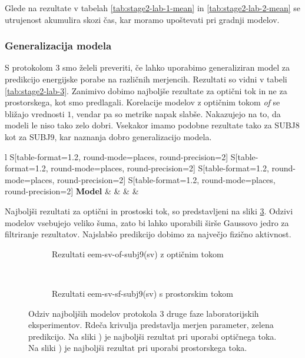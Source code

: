 Glede na rezultate v tabelah \ref{tab:stage2-lab-1-mean} in  \ref{tab:stage2-lab-2-mean} se utrujenost akumulira skozi čas, kar moramo upoštevati pri gradnji modelov.


\subsubsection{Generalizacija modela}
S protokolom 3 smo želeli preveriti, če lahko uporabimo generaliziran model za predikcijo energijske porabe na različnih merjencih. Rezultati so vidni v tabeli \ref{tab:stage2-lab-3}. Zanimivo dobimo najboljše rezultate za optični tok in ne za prostorskega, kot smo predlagali. Korelacije modelov z optičnim tokom \textit{of} se bližajo vrednosti $1$, vendar pa so metrike napak slabše. Nakazujejo na to, da modeli le niso tako zelo dobri. Vsekakor imamo podobne rezultate tako za SUBJ8 kot za SUBJ9, kar naznanja dobro generalizacijo modela.

\begin{table}[!htbp]
	\centering
	\begin{tabular}{l S[table-format=1.2, round-mode=places, round-precision=2] S[table-format=1.2, round-mode=places, round-precision=2] S[table-format=1.2, round-mode=places, round-precision=2] S[table-format=1.2, round-mode=places, round-precision=2]}
		\toprule
		\textbf{Model} &  &  &  &  \\
		\midrule
		\bottomrule
	\end{tabular}
	\caption{Validacijske metrike za protokol 3 druge faze laboratorijskih eksperimentov.}
	\label{tab:stage2-lab-3}
\end{table}

Najboljši rezultati za optični in prostoski tok, so predstavljeni na sliki \ref{fig:lab-3}. Odzivi modelov vsebujejo veliko šuma, zato bi lahko uporabili širše Gaussovo jedro za filtriranje rezultatov. Najslabšo predikcijo dobimo za največjo fizično aktivnost.

\begin{figure}[!htbp]
	\centering
	\begin{subfigure}[t]{0.45\columnwidth}
		\caption{Rezultati eem-sv-of-subj9(sv) z optičnim tokom}
		\label{fig:lab-of-3}
	\end{subfigure}
	~
	\begin{subfigure}[t]{0.45\columnwidth}
		\caption{Rezultati eem-sv-sf-subj9(sv) s prostorskim tokom}
		\label{fig:lab-sf-3}
	\end{subfigure}
	\caption[Odziv SUBJ9 modelov protokola 3 druge faze laboratorijskih eksperimentov]{Odziv najboljših modelov protokola 3 druge faze laboratorijskih eksperimentov. Rdeča krivulja predstavlja merjen parameter, zelena predikcijo. Na sliki ) je najboljši rezultat pri uporabi optičnega toka. Na sliki ) je najboljši rezultat pri uporabi prostorskega toka.}
	\label{fig:lab-3}
\end{figure}

